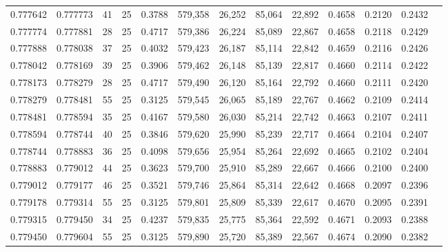 \begin{tabular}{rrrrrrrrrrrrr}
0.777642 & 0.777773 &    41 &  25 &                                     0.3788 & 579,358 &  26,252 &  85,064 &  22,892 & 0.4658 & 0.2120 & 0.2432 \\
0.777774 & 0.777881 &    28 &  25 &                                     0.4717 & 579,386 &  26,224 &  85,089 &  22,867 & 0.4658 & 0.2118 & 0.2429 \\
0.777888 & 0.778038 &    37 &  25 &                                     0.4032 & 579,423 &  26,187 &  85,114 &  22,842 & 0.4659 & 0.2116 & 0.2426 \\
0.778042 & 0.778169 &    39 &  25 &                                     0.3906 & 579,462 &  26,148 &  85,139 &  22,817 & 0.4660 & 0.2114 & 0.2422 \\
0.778173 & 0.778279 &    28 &  25 &                                     0.4717 & 579,490 &  26,120 &  85,164 &  22,792 & 0.4660 & 0.2111 & 0.2420 \\
0.778279 & 0.778481 &    55 &  25 &                                     0.3125 & 579,545 &  26,065 &  85,189 &  22,767 & 0.4662 & 0.2109 & 0.2414 \\
0.778481 & 0.778594 &    35 &  25 &                                     0.4167 & 579,580 &  26,030 &  85,214 &  22,742 & 0.4663 & 0.2107 & 0.2411 \\
0.778594 & 0.778744 &    40 &  25 &                                     0.3846 & 579,620 &  25,990 &  85,239 &  22,717 & 0.4664 & 0.2104 & 0.2407 \\
0.778744 & 0.778883 &    36 &  25 &                                     0.4098 & 579,656 &  25,954 &  85,264 &  22,692 & 0.4665 & 0.2102 & 0.2404 \\
0.778883 & 0.779012 &    44 &  25 &                                     0.3623 & 579,700 &  25,910 &  85,289 &  22,667 & 0.4666 & 0.2100 & 0.2400 \\
0.779012 & 0.779177 &    46 &  25 &                                     0.3521 & 579,746 &  25,864 &  85,314 &  22,642 & 0.4668 & 0.2097 & 0.2396 \\
0.779178 & 0.779314 &    55 &  25 &                                     0.3125 & 579,801 &  25,809 &  85,339 &  22,617 & 0.4670 & 0.2095 & 0.2391 \\
0.779315 & 0.779450 &    34 &  25 &                                     0.4237 & 579,835 &  25,775 &  85,364 &  22,592 & 0.4671 & 0.2093 & 0.2388 \\
0.779450 & 0.779604 &    55 &  25 &                                     0.3125 & 579,890 &  25,720 &  85,389 &  22,567 & 0.4674 & 0.2090 & 0.2382 \\

\end{tabular}
